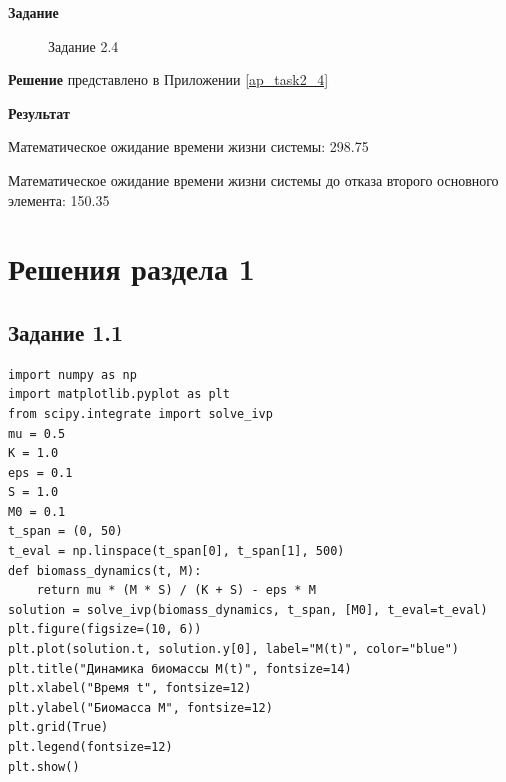 \documentclass[otchet]{SCWorks}
\begin{document}
\textbf{Задание}

\begin{figure}[H]
	\caption{Задание 2.4}
	\label{pic6}
\end{figure}

\textbf{Решение} представлено в Приложении \ref{ap_task2_4}

\textbf{Результат} 

Математическое ожидание времени жизни системы: 298.75

Математическое ожидание времени жизни системы до отказа второго основного элемента: 150.35

\appendix
\section{Решения раздела 1}
\subsection{Задание 1.1}
\label{ap_task1_1}
\begin{verbatim}
import numpy as np
import matplotlib.pyplot as plt
from scipy.integrate import solve_ivp
mu = 0.5
K = 1.0 
eps = 0.1
S = 1.0 
M0 = 0.1
t_span = (0, 50) 
t_eval = np.linspace(t_span[0], t_span[1], 500) 
def biomass_dynamics(t, M):
    return mu * (M * S) / (K + S) - eps * M
solution = solve_ivp(biomass_dynamics, t_span, [M0], t_eval=t_eval)
plt.figure(figsize=(10, 6))
plt.plot(solution.t, solution.y[0], label="M(t)", color="blue")
plt.title("Динамика биомассы M(t)", fontsize=14)
plt.xlabel("Время t", fontsize=12)
plt.ylabel("Биомасса M", fontsize=12)
plt.grid(True)
plt.legend(fontsize=12)
plt.show()
\end{verbatim}
\end{document}
